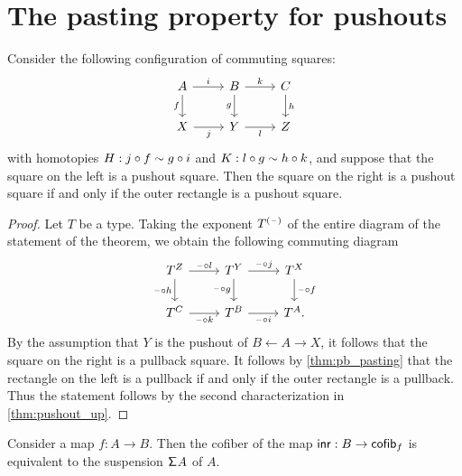 \section{The pasting property for pushouts}
\begin{thm}\label{thm:pushout_pasting}
Consider the following configuration of commuting squares:
\begin{equation*}
\begin{tikzcd}
A \arrow[r,"i"] \arrow[d,swap,"f"] & B \arrow[r,"k"] \arrow[d,swap,"g"] & C \arrow[d,"h"] \\
X \arrow[r,swap,"j"] & Y \arrow[r,swap,"l"] & Z
\end{tikzcd}
\end{equation*}
with homotopies $H:j\circ f\sim g\circ i$ and $K:l\circ g\sim h\circ k$, and suppose that the square on the left is a pushout square. 
Then the square on the right is a pushout square if and only if the outer rectangle is a pushout square.
\end{thm}

\begin{proof}
Let $T$ be a type. Taking the exponent $T^{(\mathord{\hspace{1pt}\text{--}\hspace{1pt}})}$ of the entire diagram of the statement of the theorem, we obtain the following commuting diagram
\begin{equation*}
\begin{tikzcd}
T^Z \arrow[r,"\blank\circ l"] \arrow[d,swap,"\blank\circ h"] & T^Y \arrow[d,swap,"\blank\circ g"] \arrow[r,"\blank\circ j"] & T^X \arrow[d,"\blank\circ f"] \\
T^C \arrow[r,swap,"\blank\circ k"] & T^B \arrow[r,swap,"\blank\circ i"] & T^A.
\end{tikzcd}
\end{equation*}
By the assumption that $Y$ is the pushout of $B\leftarrow A \rightarrow X$, it follows that the square on the right is a pullback square. It follows by \autoref{thm:pb_pasting} that the rectangle on the left is a pullback if and only if the outer rectangle is a pullback. Thus the statement follows by the second characterization in \autoref{thm:pushout_up}.
\end{proof}

\begin{lem}
Consider a map $f:A\to B$. Then the cofiber of the map ${\mathsf{inr}}:B\to \mathsf{cofib}_f$ is equivalent to the suspension $\mathsf{\Sigma}^{}{A}$ of $A$. 
\end{lem}

